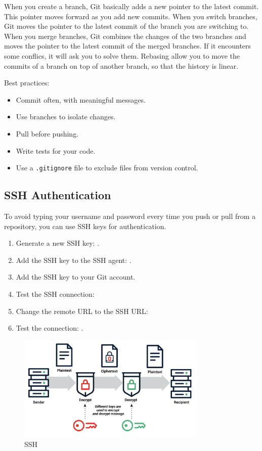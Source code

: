 When you create a branch, Git basically adds a new pointer to the latest commit. This pointer moves forward as you add new commits. 
When you switch branches, Git moves the pointer to the latest commit of the branch you are switching to.
When you merge branches, Git combines the changes of the two branches and moves the pointer to the latest commit of the merged branches. If it encounters some conflics, it will ask you to solve them.
Rebasing allow you to move the commits of a branch on top of another branch, so that the history is linear.

Best practices:
\begin{itemize}
    \item Commit often, with meaningful messages.
    \item Use branches to isolate changes.
    \item Pull before pushing.
    \item Write tests for your code.
    \item Use a \texttt{.gitignore} file to exclude files from version control.
\end{itemize}

\subsection{SSH Authentication}

To avoid typing your username and password every time you push or pull from a repository, you can use SSH keys for authentication.

\begin{tipsblock}
    \begin{enumerate}
        \item Generate a new SSH key: .
        \item Add the SSH key to the SSH agent: \newline {}.
        \item Add the SSH key to your Git account.
        \item Test the SSH connection: 
        \item Change the remote URL to the SSH URL: 
        \item Test the connection: .
    \end{enumerate}
\end{tipsblock}

\begin{figure}
    \centering
    \includegraphics[width=0.8\textwidth]{assets/ssh.png}
    \caption{SSH}
    \label{fig:ssh}
\end{figure}
